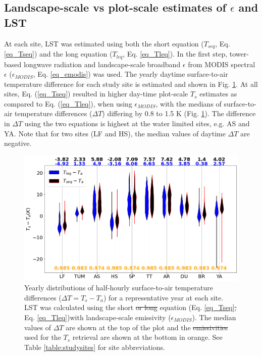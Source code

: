 \documentclass[fleqn,10pt]{wlscirep}
\providecommand{\DIFaddtex}[1]{{\protect\color{blue}\uwave{#1}}} %
\providecommand{\DIFdeltex}[1]{{\protect\color{red}\sout{#1}}}                      %
\providecommand{\DIFaddFL}[1]{\DIFadd{#1}} %
\providecommand{\DIFdelFL}[1]{\DIFdel{#1}} %
\providecommand{\DIFaddbeginFL}{} %
\providecommand{\DIFaddendFL}{} %
\providecommand{\DIFdelbeginFL}{} %
\providecommand{\DIFdelendFL}{} %
\providecommand{\DIFadd}[1]{\texorpdfstring{\DIFaddtex{#1}}{#1}} %
\providecommand{\DIFdel}[1]{\texorpdfstring{\DIFdeltex{#1}}{}} %
\begin{document}
\subsection{Landscape-scale vs plot-scale estimates of $\epsilon$ and LST}
At each site, LST was estimated using both the short equation ($T_{seq}$, Eq. \ref{eq_Tseq}) and the long equation ($T_{leq}$, Eq. \ref{eq_Tleq}). In the first step, tower-based longwave radiation and landscape-scale broadband $\epsilon$ from MODIS spectral $\epsilon$ ($\epsilon_{MODIS}$, Eq. \ref{eq_emodis}) was used. The yearly daytime surface-to-air temperature difference for each study site is estimated and shown in Fig. \ref{fig:long_short_eq_epsilon_MODIS}. At all sites, Eq. (\ref{eq_Tseq}) resulted in higher day-time plot-scale $T_{s}$ estimates as compared to Eq. (\ref{eq_Tleq}), when using $\epsilon_{MODIS}$, with the medians of surface-to-air temperature differences ($\Delta T$) differing by 0.8 to 1.5 K (Fig. \ref{fig:long_short_eq_epsilon_MODIS}). The difference in $\Delta T$ using the two equations is highest at the water limited sites, e.g. AS and YA. Note that for two sites (LF and HS), the median values of daytime $\Delta T$ are negative.
\begin{figure}[h!]
	\includegraphics[scale=0.35]{tsta_violion.png} %
	\centering
    \caption{
     Yearly distributions of half-hourly surface-to-air temperature differences ($\Delta T = T_s - T_a$) for a representative year at each site.  
    LST was calculated using the short \DIFdelbeginFL \DIFdelFL{or long }\DIFdelendFL equation (Eq. \DIFaddbeginFL \DIFaddFL{(}\DIFaddendFL \ref{eq_Tseq}\DIFdelbeginFL \DIFdelFL{, }\DIFdelendFL \DIFaddbeginFL \DIFaddFL{)) or long equation (}\DIFaddendFL Eq. \DIFaddbeginFL \DIFaddFL{(}\DIFaddendFL \ref{eq_Tleq})\DIFaddbeginFL \DIFaddFL{) }\DIFaddendFL with landscape-scale emissivity ($\epsilon_{MODIS}$). The median values of $\Delta T$ are shown at the top of the plot and the  \DIFdelbeginFL \DIFdelFL{emissivities }\DIFdelendFL \DIFaddbeginFL \DIFaddFL{$\epsilon_{MODIS}$ }\DIFaddendFL used for the $T_{s}$ retrieval are shown at the bottom in orange. See Table \ref{table:studysites} for site abbreviations.}
	\label{fig:long_short_eq_epsilon_MODIS}
\end{figure}
\end{document}
